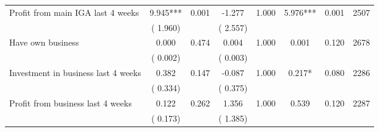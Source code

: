 \begin{tabular}{l*{7}{c}}
 Profit from main IGA last 4 weeks       &              9.945***       &        0.001  &             -1.277       &        1.000  &              5.976***       &              0.001 &  2507 \\ 
                       &       (       1.960)             &                               &       (       2.557)                     &                               &                                               &                                &                      \\ 

 Have own business       &              0.000       &        0.474  &              0.004       &        1.000  &              0.001       &              0.120 &  2678 \\ 
                       &       (       0.002)             &                               &       (       0.003)                     &                               &                                               &                                &                      \\ 

 Investment in business last 4 weeks       &              0.382       &        0.147  &             -0.087       &        1.000  &              0.217*       &              0.080 &  2286 \\ 
                       &       (       0.334)             &                               &       (       0.375)                     &                               &                                               &                                &                      \\ 

 Profit from business last 4 weeks       &              0.122       &        0.262  &              1.356       &        1.000  &              0.539       &              0.120 &  2287 \\ 
                       &       (       0.173)             &                               &       (       1.385)                     &                               &                                               &                                &                      \\ 

\hline \end{tabular}